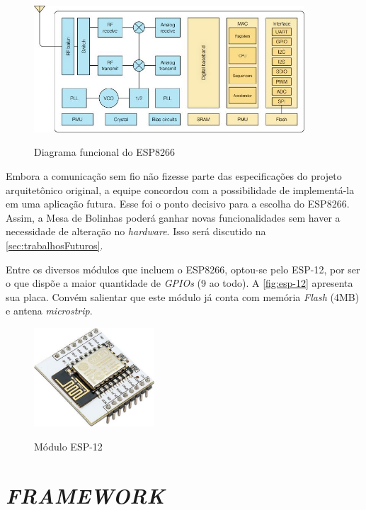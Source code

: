 \begin{figure}[!htb]
    \centering
    \caption{Diagrama funcional do ESP8266}
    \includegraphics[width=0.9\textwidth]{./dados/figuras/esp-funcional}
    \label{fig:esp-funcional}
\end{figure}

Embora a comunicação sem fio não fizesse parte das especificações do projeto arquitetônico original, a equipe concordou com a possibilidade de implementá-la em uma aplicação futura. Esse foi o ponto decisivo para a escolha do ESP8266. Assim, a Mesa de Bolinhas poderá ganhar novas funcionalidades sem haver a necessidade de alteração no \emph{hardware}. Isso será discutido na \autoref{sec:trabalhosFuturos}.

Entre os diversos módulos que incluem o ESP8266, optou-se pelo ESP-12, por ser o que dispõe a maior quantidade de \emph{GPIOs} (9 ao todo). A \autoref{fig:esp-12} apresenta sua placa. Convém salientar que este módulo já conta com memória \emph{Flash} (4MB) e antena \emph{microstrip}.

\begin{figure}[H]
    \centering
    \caption{Módulo ESP-12}
    \includegraphics[width=0.4\textwidth]{./dados/figuras/esp-12}
    \label{fig:esp-12}
\end{figure}

\section{\emph{FRAMEWORK}}
\label{sec:framework}

